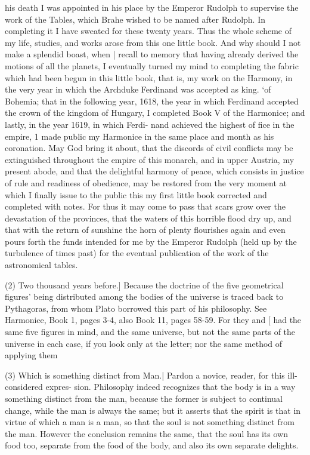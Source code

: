 \documentclass{article}
\begin{document}
{{{{{{{his death I was appointed in his place by the Emperor Rudolph to supervise the work of the Tables, which
Brahe wished to be named after Rudolph. In completing it I have sweated for these twenty years. Thus
the whole scheme of my life, studies, and works arose from this one little book. And why should I not
make a splendid boast, when | recall to memory that having already derived the motions of all the
planets, I eventually turned my mind to completing the fabric which had been begun in this little book,
that is, my work on the Harmony, in the very year in which the Archduke Ferdinand was accepted as king.
‘of Bohemia; that in the following year, 1618, the year in which Ferdinand accepted the crown of the
kingdom of Hungary, I completed Book V of the Harmonice; and lastly, in the year 1619, in which Ferdi-
nand achieved the highest of fice in the empire, 1 made public my Harmonice in the same place and month
as his coronation. May God bring it about, that the discords of civil conflicts may be extinguished
throughout the empire of this monarch, and in upper Austria, my present abode, and that the delightful
harmony of peace, which consists in justice of rule and readiness of obedience, may be restored from the
very moment at which I finally issue to the public this my first little book corrected and completed with
notes. For thus it may come to pass that scars grow over the devastation of the provinces, that the waters
of this horrible flood dry up, and that with the return of sunshine the horn of plenty flourishes again and
even pours forth the funds intended for me by the Emperor Rudolph (held up by the turbulence of times
past) for the eventual publication of the work of the astronomical tables.

(2) Two thousand years before.] Because the doctrine of the five geometrical figures’ being distributed
among the bodies of the universe is traced back to Pythagoras, from whom Plato borrowed this part of
his philosophy. See Harmonice, Book 1, pages 3-4, also Book 11, pages 58-59. For they and [ had the
same five figures in mind, and the same universe, but not the same parts of the universe in each case, if
you look only at the letter; nor the same method of applying them

(3) Which is something distinct from Man.| Pardon a novice, reader, for this ill-considered expres-
sion. Philosophy indeed recognizes that the body is in a way something distinct from the man, because
the former is subject to continual change, while the man is always the same; but it asserts that the spirit is
that in virtue of which a man is a man, so that the soul is not something distinct from the man. However
the conclusion remains the same, that the soul has its own food too, separate from the food of the body,
and also its own separate delights.

}}}}}}}
\end{document}
